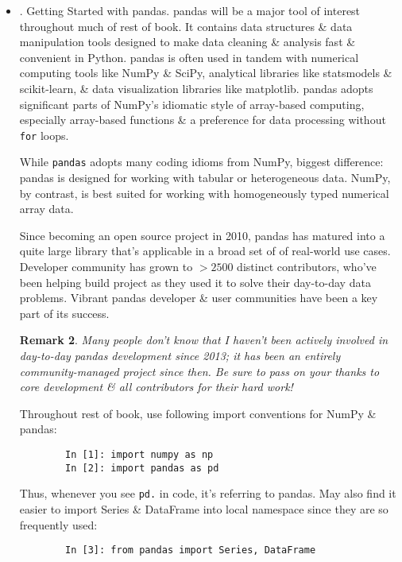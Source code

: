 \documentclass{article}
\newtheorem{remark}{Remark}
\begin{document}
\begin{itemize}
\begin{itemize}
\begin{itemize}
			\begin{remark}
				Keep in mind: this vectorized approach requires creating an array with {\tt nwalks * nsteps} elements, which may use a large amount of memory for large simulations. If memory is more constrained, then a different approach will be required.
			\end{remark}
		\end{itemize}
		\item {. Conclusion.} While much of rest of book will focus on building data wrangling skills with pandas -- xây dựng kỹ năng xử lý dữ liệu với pandas, continue to work in a similar array-based style. In Appendix A, dig deeper into NumPy features to help you further develop your array computing skills.
	\end{itemize}
	\item {. Getting Started with pandas.} pandas will be a major tool of interest throughout much of rest of book. It contains data structures \& data manipulation tools designed to make data cleaning \& analysis fast \& convenient in Python. pandas is often used in tandem with numerical computing tools like NumPy \& SciPy, analytical libraries like statsmodels \& scikit-learn, \& data visualization libraries like matplotlib. pandas adopts significant parts of NumPy's idiomatic style of array-based computing, especially array-based functions \& a preference for data processing without {\tt for} loops.
	
	While {\tt pandas} adopts many coding idioms from NumPy, biggest difference: pandas is designed for working with tabular or heterogeneous data. NumPy, by contrast, is best suited for working with homogeneously typed numerical array data.
	
	Since becoming an open source project in 2010, pandas has matured into a quite large library that's applicable in a broad set of of real-world use cases. Developer community has grown to $> 2500$ distinct contributors, who've been helping build project as they used it to solve their day-to-day data problems. Vibrant pandas developer \& user communities have been a key part of its success.
	\begin{remark}
		Many people don't know that I haven't been actively involved in day-to-day pandas development since 2013; it has been an entirely community-managed project since then. Be sure to pass on your thanks to core development \& all contributors for their hard work!
	\end{remark}
	Throughout rest of book, use following import conventions for NumPy \& pandas:
	\begin{verbatim}
		In [1]: import numpy as np
		In [2]: import pandas as pd
	\end{verbatim}
	Thus, whenever you see {\tt pd.} in code, it's referring to pandas. May also find it easier to import Series \& DataFrame into local namespace since they are so frequently used:
	\begin{verbatim}
		In [3]: from pandas import Series, DataFrame
	\end{verbatim}
	

\end{itemize}
\end{document}
